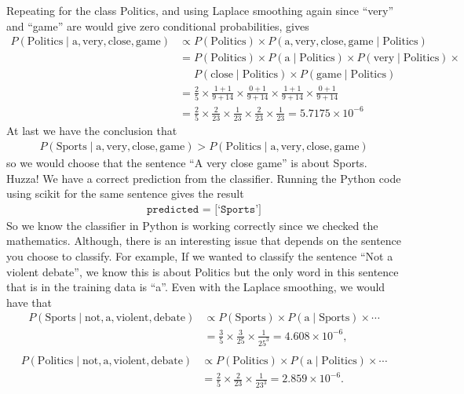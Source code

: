 \documentclass[12pt,twoside]{report}   %
\newcommand{\te}{\text}
\begin{document}
Repeating for the class Politics, and using Laplace smoothing again since ``very'' and ``game'' are would give zero conditional probabilities, gives
\begin{align*}
P(\text{Politics}\mid \te{a}, \te{very}, \te{close}, \te{game}) &\propto P(\te{Politics})\times P(\te{a}, \te{very}, \te{close}, \te{game}\mid\te{Politics})\\
&= P(\te{Politics})\times P(\te{a}\mid\te{Politics})\times P(\te{very}\mid\te{Politics})\times\\
&\quad\,\,P(\te{close}\mid\te{Politics})\times P(\te{game}\mid\te{Politics})\\
&= \frac{2}{5} \times \frac{1+1}{9+14} \times \frac{0+1}{9+14} \times \frac{1+1}{9+14} \times \frac{0+1}{9+14}\\
&= \frac{2}{5} \times \frac{2}{23} \times \frac{1}{23} \times \frac{2}{23} \times \frac{1}{23} = 5.7175\times10^{-6}
\end{align*}
At last we have the conclusion that
\begin{align*}
P(\text{Sports}\mid \te{a}, \te{very}, \te{close}, \te{game}) > P(\text{Politics}\mid \te{a}, \te{very}, \te{close}, \te{game})
\end{align*}
so we would choose that the sentence ``A very close game'' is about Sports. Huzza! We have a correct prediction from the classifier. Running the Python code using scikit for the same sentence gives the result
\begin{align*}
\texttt{predicted = [`Sports']}
\end{align*}
So we know the classifier in Python is working correctly since we checked the mathematics.  Although, there is an interesting issue that depends on the sentence you choose to classify. For example, If we wanted to classify the sentence ``Not a violent debate'', we know this is about Politics but the only word in this sentence that is in the training data is ``a''. Even with the Laplace smoothing, we would have that
\begin{align*}
P(\text{Sports}\mid \te{not}, \te{a}, \te{violent}, \te{debate}) &\propto P(\te{Sports})\times P(\te{a}\mid\te{Sports})\times\cdots\\
&= \frac{3}{5}\times\frac{3}{25}\times\frac{1}{25^3} = 4.608\times10^{-6},\\
\end{align*}
\vspace{-25pt}
\begin{align*}
P(\text{Politics}\mid \te{not}, \te{a}, \te{violent}, \te{debate}) &\propto P(\te{Politics})\times P(\te{a}\mid\te{Politics})\times\cdots\\
&= \frac{2}{5}\times\frac{2}{23}\times\frac{1}{23^3} = 2.859\times10^{-6}.\\
\end{align*}
\end{document}
